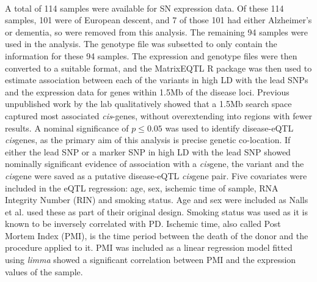 \documentclass{article}
\begin{document}
\\A total of 114 samples were available for SN expression data. Of these 114 samples, 101 were of European descent, and  7 of those 101 had either Alzheimer's or dementia, so were removed from this analysis. The remaining 94 samples were used in the analysis. The genotype file was subsetted to only contain the information for these 94 samples. The expression and genotype files were then converted to a suitable format, and the MatrixEQTL R package\cite{Shabalin2012MatrixOperations.} was then used to estimate association between each of the variants in high LD with the lead SNPs and the expression data for genes within 1.5Mb of the disease loci. Previous unpublished work by the lab qualitatively showed that a 1.5Mb search space captured most associated \textit{cis}-genes, without overextending into regions with fewer results. A nominal significance of $p\leq0.05$ was used to identify disease-eQTL \textit{cis}genes, as the primary aim of this analysis is precise genetic co-location. If either the lead SNP or a marker SNP in high LD with the lead SNP showed nominally significant evidence of association with a \textit{cis}gene, the variant and the \textit{cis}gene were saved as a putative disease-eQTL \textit{cis}gene pair. Five covariates were included in the eQTL regression: age, sex, ischemic time of sample, RNA Integrity Number (RIN) and smoking status. Age and sex were included as Nalls et al.\cite{Nalls2019IdentificationStudies} used these as part of their original design. Smoking status was used as it is known to be inversely correlated with PD\cite{Ben-Shlomo2024TheDisease}. Ischemic time, also called Post Mortem Index (PMI), is the time period between the death of the donor and the procedure applied to it. PMI was included as a linear regression model fitted using \textit{limma}\cite{Ritchie2015LimmaStudies} showed a significant correlation between PMI and the expression values of the sample.
\end{document}
